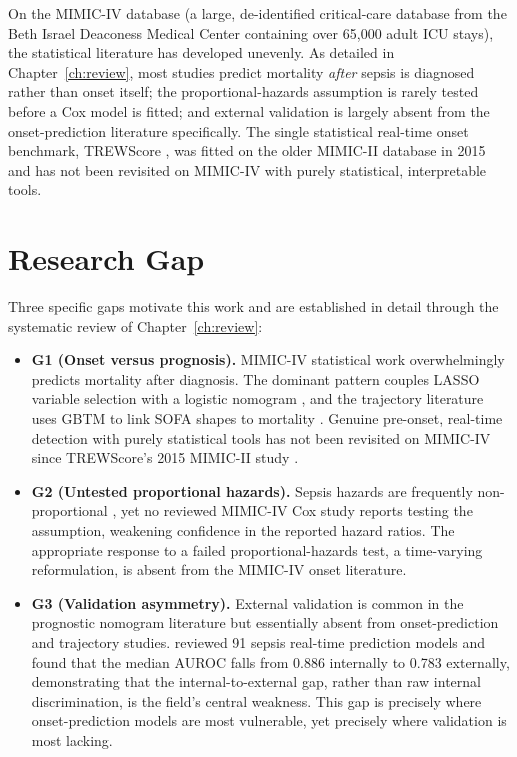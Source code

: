 On the MIMIC-IV database \cite{johnson2023mimiciv} (a large, de-identified
critical-care database from the Beth Israel Deaconess Medical Center
containing over 65{,}000 adult ICU stays), the statistical literature has
developed unevenly. As detailed in Chapter~\ref{ch:review}, most studies
predict mortality \emph{after} sepsis is diagnosed rather than onset itself;
the proportional-hazards assumption is rarely tested before a Cox model is
fitted; and external validation is largely absent from the onset-prediction
literature specifically. The single statistical real-time onset benchmark,
TREWScore \cite{henry2015trewscore}, was fitted on the older MIMIC-II database
in 2015 and has not been revisited on MIMIC-IV with purely statistical,
interpretable tools.

\section{Research Gap}
\label{sec:gap}
Three specific gaps motivate this work and are established in detail through
the systematic review of Chapter~\ref{ch:review}:

\begin{itemize}
  \item \textbf{G1 (Onset versus prognosis).} MIMIC-IV statistical work
  overwhelmingly predicts mortality after diagnosis. The dominant pattern
  couples LASSO variable selection with a logistic nomogram
  \cite{yuan2023nomogram}, and the trajectory literature uses GBTM to link SOFA
  shapes to mortality \cite{yang2022gbtm}. Genuine pre-onset, real-time
  detection with purely statistical tools has not been revisited on MIMIC-IV
  since TREWScore's 2015 MIMIC-II study \cite{henry2015trewscore}.

  \item \textbf{G2 (Untested proportional hazards).} Sepsis hazards are
  frequently non-proportional \cite{kasal2004cox}, yet no reviewed MIMIC-IV Cox
  study reports testing the assumption, weakening confidence in the reported
  hazard ratios. The appropriate response to a failed proportional-hazards
  test, a time-varying reformulation, is absent from the MIMIC-IV onset
  literature.

  \item \textbf{G3 (Validation asymmetry).} External validation is common in the
  prognostic nomogram literature but essentially absent from onset-prediction
  and trajectory studies. \textcite{wang2025srpm} reviewed 91
  sepsis real-time prediction models and found that the median AUROC falls from
  0.886 internally to 0.783 externally, demonstrating that the
  internal-to-external gap, rather than raw internal discrimination, is the
  field's central weakness. This gap is precisely where onset-prediction models
  are most vulnerable, yet precisely where validation is most lacking.
\end{itemize}

